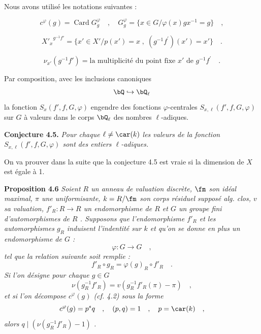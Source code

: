 Nous avons utilisé les notations suivantes :

\begin{equation}\tag{4.2}
c^\varphi(g) = \operatorname{Card} G_g^\varphi \quad , \quad G_g^\varphi = \{ x \in G / \varphi(x)gx^{-1} = g \} \quad ,
\end{equation}

\begin{equation}\tag{4.3}
{X'_x}^{g^{-1}f'} = \{ x' \in X' / p(x') = x \; , \; (g^{-1}f^{\prime})(x') = x' \} \quad .
\end{equation}

\begin{equation}\tag{4.4}
\nu_{x'}(g^{-1}f') = \text{la multiplicité du point fixe } x' \text{ de } g^{-1}f^{\prime} \quad .
\end{equation}

Par composition, avec les inclusions canoniques
\[
\bQ \hookrightarrow \bQ_\ell
\]
la
fonction $S_x(f',f,G,\varphi)$ engendre des fonctions $\varphi$-centrales $S_{x,\ell}(f',f,G,\varphi)$ sur $G$ à valeurs dans le corps $\bQ_\ell$ des nombres $\ell$-adiques.

\medskip
\noindent
\textbf{Conjecture 4.5.} \emph{Pour chaque $\ell \neq \car(k)$ les valeurs de la fonction $S_{x,\ell}(f',f,G,\varphi)$ sont des entiers $\ell$-adiques.}

\medskip

On va prouver dans la suite que la conjecture 4.5 est vraie si la dimension de $X$ est égale à 1.

\medskip
\noindent
\textbf{Proposition 4.6} \emph{Soient $R$ un anneau de valuation discrète, $\fm$ son idéal maximal, $\pi$ une uniformisante, $k = R/\fm$ son corps résiduel supposé alg. clos, $v$ sa valuation, $f'_R : R \to R$ un endomorphisme de $R$ et $G$ un groupe fini d'automorphismes de $R$ . Supposons que l'endomorphisme $f'_R$ et les automorphismes $g_R$ induisent l'indentité sur $k$ et qu'on se donne en plus un endomorphisme de $G$ :
\[
\varphi : G \longrightarrow G \quad ,
\]
tel que la relation suivante soit remplie :
\[
f'_R \circ g_R = \varphi(g)_R \circ f'_R \quad .
\]
Si l'on désigne pour chaque $g \in G$
\[
\nu(g_R^{-1}f'_R) = v(g_R^{-1}f'_R(\pi) - \pi) \quad ,
\]
et si l'on décompose $c^\varphi(g)$ (cf. 4.2) sous la forme
\[
c^\varphi(g) = p^s q \quad , \quad (p,q) = 1 \quad , \quad p = \car(k) \quad ,
\]
alors $q \mid (\nu(g_R^{-1}f'_R) - 1)$ .}

